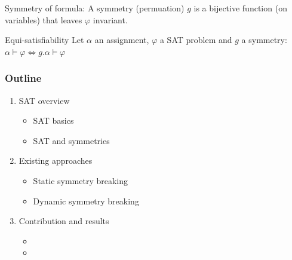 \documentclass{beamer}
\begin{document}
\begin{frame}
	Symmetry of formula:
	A symmetry (permuation) $g$ is a bijective function (on variables) that leaves $\varphi$ invariant.
	
	\vfill
	Equi-satisfiability
	Let $\alpha$ an assignment, $\varphi$ a SAT problem and $g$ a symmetry:
	$\alpha \models \varphi \Leftrightarrow g.\alpha \models \varphi$
	
	\vfill
\end{frame}


\begin{frame}
\frametitle{Outline}
\begin{enumerate}
	\item \textcolor{UPMCEngagementBlueB}{SAT overview}
	\begin{itemize}
		\item[] SAT basics
		\item[] SAT and symmetries
	\end{itemize}
	\vspace{5pt}
	\item \textcolor{UPMCEngagementBlueB}{Existing approaches}
	\begin{itemize}
		\item[] Static symmetry breaking
		\item[] Dynamic symmetry breaking
	\end{itemize}
	\vspace{5pt}
	\item \textcolor{UPMCEngagementBlueB}{Contribution and results} 
	\begin{itemize}
		\item[] \phantom{CDCL [Sym]}
		\item[] \phantom{Combination of different approaches}
	\end{itemize}
\end{enumerate}
\end{frame}
\end{document}
